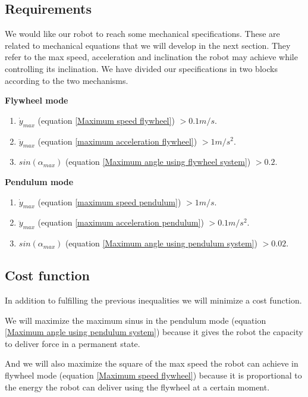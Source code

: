 \subsection{Requirements}
We would like our robot to reach some mechanical specifications. These are related to mechanical equations
that we will develop in the next section. They refer to the max speed, acceleration and inclination the robot may achieve
while controlling its inclination. We have divided our specifications in two blocks
according to the two mechanisms.

\textbf{Flywheel mode}
\begin{enumerate}
	\item $\dot{y}_{max}$ (equation \ref{Maximum speed flywheel}) $> 0.1m/s$.
	\item $\ddot{y}_{max}$ (equation \ref{maximum acceleration flywheel}) $> 1m/s^2$.
	\item $sin(\alpha_{max})$ (equation \ref{Maximum angle using flywheel system}) $>0.2$.
\end{enumerate}

\textbf{Pendulum mode}
\begin{enumerate}
	\item $\dot{y}_{max}$ (equation \ref{maximum speed pendulum}) $>1m/s$.
	\item $\ddot{y}_{max}$ (equation \ref{maximum acceleration pendulum}) $>0.1m/s^2$.
	\item $sin(\alpha_{max})$ (equation \ref{Maximum angle using pendulum system}) $> 0.02$.
\end{enumerate}
	


\subsection{Cost function}
In addition to fulfilling the previous inequalities we will
minimize a cost function.

We will maximize the maximum sinus in the pendulum mode 
(equation \ref{Maximum angle using pendulum system}) because
it gives the robot the capacity to deliver force in a permanent state.

And we will also maximize the square of the max speed the robot can achieve
in flywheel mode (equation \ref{Maximum speed flywheel}) because it is
proportional to the energy the robot can deliver using the flywheel at a certain moment.

